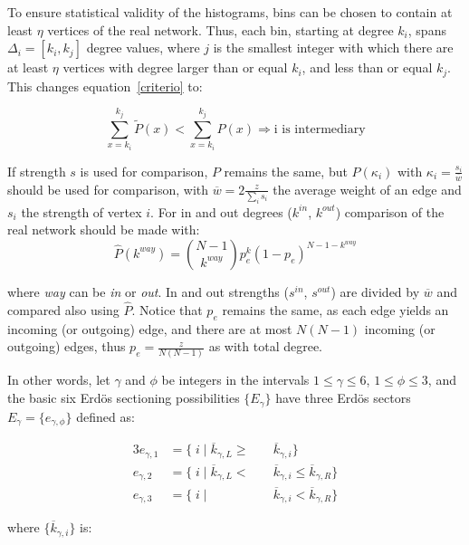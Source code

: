 \documentclass[%
 aip,
 jmp,%
 amsmath,amssymb,
 reprint,%
]{revtex4-1}
\begin{document}
To ensure statistical validity of the histograms, bins can be chosen to contain at least $\eta$ vertices of the real network. Thus, each bin, starting at degree $k_i$, spans $\Delta_i=[k_{i},k_{j}]$ degree values, where $j$ is the smallest integer with which there are at least $\eta$ vertices with degree larger than or equal $k_i$, and less than or equal $k_{j}$. This changes equation~\ref{criterio} to:

\begin{equation}\label{criterio2}
    \sum_{x=k_i}^{k_j} \widetilde{P}(x) < \sum_{x=k_i}^{k_j} P(x) \Rightarrow \text{i is intermediary}
\end{equation}

If strength $s$ is used for comparison, $P$ remains the same, but $P(\kappa_i)$ with $\kappa_i=\frac{s_i}{\overline{w}}$ should be used for comparison, with $\overline{w}=2\frac{z}{\sum_is_i}$ the average weight of an edge and $s_i$ the strength of vertex $i$. For in and out degrees ($k^{in}$, $k^{out}$) comparison of the real network should be made with:
\begin{equation}
\hat{P}(k^{way})=\binom{N-1}{k^{way}}p_e^k(1-p_e)^{N-1-k^{way}}
\end{equation}

\noindent where \emph{way} can be \emph{in} or \emph{out}. In and out strengths ($s^{in}$, $s^{out}$) are divided by $\overline{w}$ and compared also using $\hat{P}$. Notice that $p_e$ remains the same, as each edge yields an incoming (or outgoing) edge, and there are at most $N(N-1)$ incoming (or outgoing) edges, thus $p_e=\frac{z}{N(N-1)}$ as with total degree.

In other words, let $\gamma$ and $\phi$ be integers in the intervals $1 \leq \gamma \leq 6$, $1 \leq \phi \leq 3$, and the basic six Erd\"os sectioning possibilities $\{E_{\gamma}\}$ have three Erd\"os sectors $E_{\gamma}= \{e_{\gamma, \phi} \}$ defined as:

\begin{alignat}{3}\label{eq:part}
e_{\gamma,1}&=\{\;i\;|\;\overline{k}_{\gamma,L}\geq&&\overline{k}_{\gamma,i}\} \nonumber \\
e_{\gamma,2}&=\{\;i\;|\;\overline{k}_{\gamma,L}<\;&&\overline{k}_{\gamma,i}\leq\overline{k}_{\gamma,R}\} \\ 
e_{\gamma,3}&=\{\;i\;|\;&&\overline{k}_{\gamma,i}<\overline{k}_{\gamma,R}\} \nonumber
\end{alignat}

\noindent where $\{\overline{k}_{\gamma,i}\}$ is:
\end{document}
